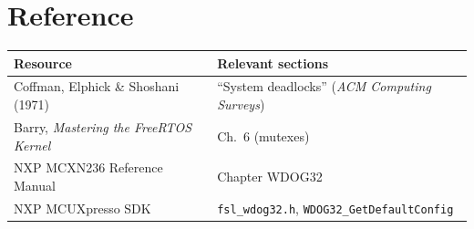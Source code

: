 \documentclass[11pt, a4paper]{article}
\begin{document}
\section{Reference}

\renewcommand{\arraystretch}{1.3}
\begin{tabular}{@{} p{5.5cm} p{7.5cm} @{}}
  \toprule
  \textbf{Resource} & \textbf{Relevant sections} \\
  \midrule
  Coffman, Elphick \& Shoshani (1971) &
    ``System deadlocks'' (\textit{ACM Computing Surveys}) \\
  Barry, \textit{Mastering the FreeRTOS Kernel} & Ch.~6 (mutexes) \\
  NXP MCXN236 Reference Manual & Chapter WDOG32 \\
  NXP MCUXpresso SDK & \texttt{fsl\_wdog32.h}, \texttt{WDOG32\_GetDefaultConfig} \\
  \bottomrule
\end{tabular}
\renewcommand{\arraystretch}{1}
\end{document}
